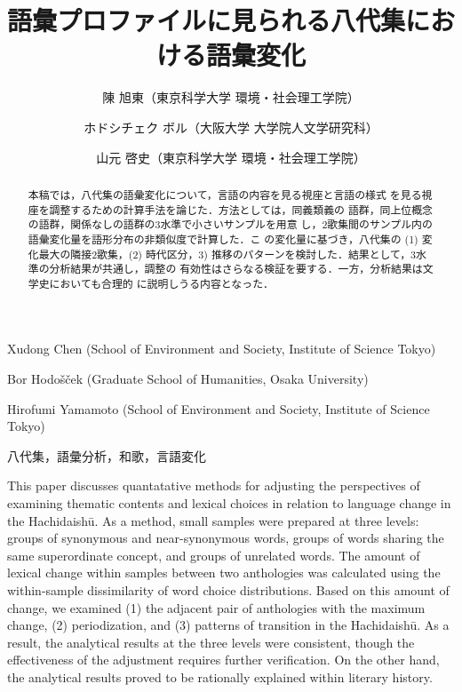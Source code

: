 \documentclass[submit]{ipsj}
\date{}
\title{}
\begin{document}
\title{語彙プロファイルに見られる八代集における語彙変化}


\author{陳 旭東（東京科学大学 環境・社会理工学院）}{Xudong Chen (School of Environment and Society, Institute of Science Tokyo)}{}
\author{ホドシチェク ボル（大阪大学 大学院人文学研究科）}{Bor Hodo\v{s}\v{c}ek (Graduate School of Humanities, Osaka University)}{}
\author{山元 啓史（東京科学大学 環境・社会理工学院）}{Hirofumi Yamamoto (School of Environment and Society, Institute of Science Tokyo)}{}

\begin{abstract}
  本稿では，八代集の語彙変化について，言語の内容を見る視座と言語の様式
  を見る視座を調整するための計算手法を論じた．方法としては，同義類義の
  語群，同上位概念の語群，関係なしの語群の3水準で小さいサンプルを用意
  し，2歌集間のサンプル内の語彙変化量を語形分布の非類似度で計算した．こ
  の変化量に基づき，八代集の (1) 変化最大の隣接2歌集，(2) 時代区分，3)
  推移のパターンを検討した．結果として，3水準の分析結果が共通し，調整の
  有効性はさらなる検証を要する．一方，分析結果は文学史においても合理的
  に説明しうる内容となった．
\end{abstract}

\begin{jkeyword}
  八代集，語彙分析，和歌，言語変化
\end{jkeyword}

\begin{eabstract}
  This paper discusses quantatative methods for adjusting the
  perspectives of examining thematic contents and lexical choices in
  relation to language change in the Hachidaishū. As a method, small
  samples were prepared at three levels: groups of synonymous and
  near-synonymous words, groups of words sharing the same
  superordinate concept, and groups of unrelated words. The amount of
  lexical change within samples between two anthologies was calculated
  using the within-sample dissimilarity of word choice
  distributions. Based on this amount of change, we examined (1) the
  adjacent pair of anthologies with the maximum change, (2)
  periodization, and (3) patterns of transition in the Hachidaishū. As
  a result, the analytical results at the three levels were
  consistent, though the effectiveness of the adjustment requires
  further verification. On the other hand, the analytical results
  proved to be rationally explained within literary history.
\end{eabstract}
\end{document}
